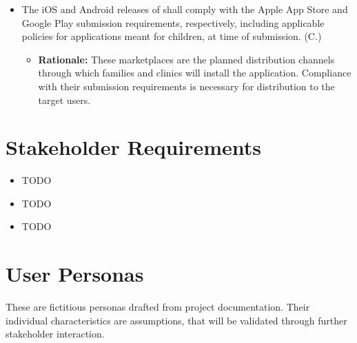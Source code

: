 \documentclass[12pt]{article}
\newcounter{connum} %
\newcounter{srnum} %
\begin{document}
\begin{itemize}
    \item The iOS and Android releases of \progname{} shall comply with the Apple App Store and Google Play submission
    requirements, respectively, including applicable policies for applications meant for children, at time of submission.
    (C.\theconnum\label{C_StoreCompliance})
    \begin{itemize}
        \item \textbf{Rationale:} These marketplaces are the planned distribution
        channels through which families and clinics will install the application. Compliance
        with their submission requirements is necessary for distribution to the target users.
    \end{itemize}
\end{itemize}

\section{Stakeholder Requirements}



\noindent \begin{itemize}

\item[SR\refstepcounter{srnum}\thesrnum \label{SR_Label1}] TODO

\item[SR\refstepcounter{srnum}\thesrnum \label{SR_Label2}] TODO

\item[SR\refstepcounter{srnum}\thesrnum \label{SR_Label3}] TODO

\end{itemize}


\section{User Personas}
These are fictitious personas drafted from project documentation.
Their individual characteristics are assumptions, that will be validated through further stakeholder interaction.
\end{document}
